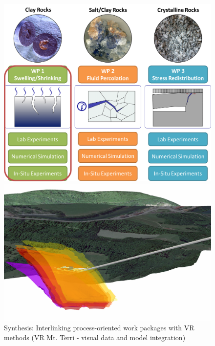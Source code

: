 \begin{figure}[t!]
\begin{minipage}{0.49\textwidth}
\includegraphics[width=1\textwidth]{figures/geomint-wp1a.png}
\end{minipage}
\hfill
\begin{minipage}{0.49\textwidth}
\includegraphics[width=1\textwidth]{figures/mt-vr-01.png}
\end{minipage}
\caption{Synthesis: Interlinking process-oriented work packages with VR methods (VR Mt. Terri - visual data and model integration)}
\label{fig:pro03}
\end{figure}

